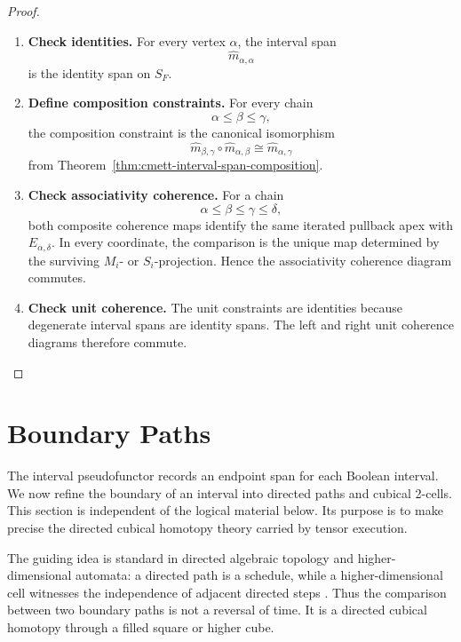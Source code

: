 \begin{proof}
    \leavevmode
    \begin{enumerate}
        \item \textbf{Check identities.}
        For every vertex \(\alpha\), the interval span
        \[
            \widehat m_{\alpha,\alpha}
        \]
        is the identity span on \(S_F\).

        \item \textbf{Define composition constraints.}
        For every chain
        \[
            \alpha\leq\beta\leq\gamma,
        \]
        the composition constraint is the canonical isomorphism
        \[
            \widehat m_{\beta,\gamma}\circ\widehat m_{\alpha,\beta}
            \cong
            \widehat m_{\alpha,\gamma}
        \]
        from Theorem~\ref{thm:cmett-interval-span-composition}.

        \item \textbf{Check associativity coherence.}
        For a chain
        \[
            \alpha\leq\beta\leq\gamma\leq\delta,
        \]
        both composite coherence maps identify the same iterated pullback
        apex with \(E_{\alpha,\delta}\). In every coordinate, the comparison
        is the unique map determined by the surviving \(M_i\)- or
        \(S_i\)-projection. Hence the associativity coherence diagram
        commutes.

        \item \textbf{Check unit coherence.}
        The unit constraints are identities because degenerate interval spans
        are identity spans. The left and right unit coherence diagrams
        therefore commute.
    \end{enumerate}
\end{proof}

\section{Boundary Paths}
\label{sec:cmett-boundary-paths}

The interval pseudofunctor records an endpoint span for each Boolean interval.
We now refine the boundary of an interval into directed paths and cubical
2-cells. This section is independent of the logical material below. Its
purpose is to make precise the directed cubical homotopy theory carried by
tensor execution.

The guiding idea is standard in directed algebraic topology and
higher-dimensional automata: a directed path is a schedule, while a
higher-dimensional cell witnesses the independence of adjacent directed steps
\cite{FajstrupGoubaultRaussen2006,FajstrupGoubaultHaucourtMimramRaussen2016,Grandis2003,Grandis2009,Gaucher2000}.
Thus the comparison between two boundary paths is not a reversal of time. It
is a directed cubical homotopy through a filled square or higher cube.

